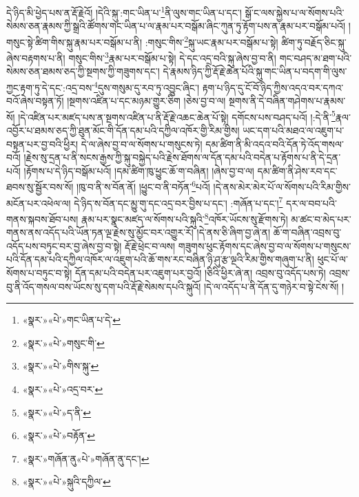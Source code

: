 དེ་ཉིད་མི་ཕྱེད་པས་ན་རྡོ་རྗེའོ། །དེའི་སྐུ་:གང་ཡིན་པ་\footnote{«སྣར་»«པེ་»གང་ཡིན་པ་དེ་}ནི་ལུས་གང་ཡིན་པ་དང་། སྒོ་ང་ལས་སྐྱེས་པ་ལ་སོགས་པའི་སེམས་ཅན་རྣམས་ཀྱི་སྒྲའི་ཚོགས་གང་ཡིན་པ་ལ་རྣམ་པར་བསྒོམ་ཞིང་ཀུན་ཏུ་རྟོག་པས་ན་རྣམ་པར་བསྒོམ་པའོ། །གསུང་སྟེ་ཚིག་གིས་སྐུ་རྣམ་པར་བསྒོམ་པ་ནི། :གསུང་གིས་\footnote{«སྣར་»«པེ་»གསུང་གི་}སྐུ་ཡང་རྣམ་པར་བསྒོམ་པ་སྟེ། ཚིག་ཏུ་བརྗོད་ཅིང་སྐུ་ཞེས་བརྟགས་པ་ནི། གསུང་གིས་\footnote{«སྣར་»«པེ་»གིས་སྐུ་}རྣམ་པར་བསྒོམ་པ་སྟེ། དེ་དང་འདྲ་བའི་སྐུ་ཞེས་བྱ་བ་ནི། གང་བཤད་མ་ཐག་པའི་སེམས་ཅན་ཐམས་ཅད་ཀྱི་སྔགས་ཀྱི་གཟུགས་དང་། དེ་རྣམས་ཉིད་ཀྱི་རྡོ་རྗེ་ཆེན་པོའི་སྐུ་གང་ཡིན་པ་བདག་གི་ལུས་ཀྱང་རྟག་ཏུ་དེ་དང་:འདྲ་བས་\footnote{«སྣར་»«པེ་»འདྲ་བར་}དུས་གསུམ་དུ་རབ་ཏུ་འབྱུང་ཞིང་། རྟག་པ་ཉིད་དུ་ངོ་བོ་ཉིད་ཀྱིས་འདའ་བར་དཀའ་བའོ་ཞེས་བསྟན་ཏོ། །སྔགས་འཛིན་པ་དང་མཉམ་གྱུར་ཅིག །ཅེས་བྱ་བ་ལ། སྔགས་ནི་དེ་བཞིན་གཤེགས་པ་རྣམས་སོ། །དེ་འཛིན་པར་མཛད་པས་ན་སྔགས་འཛིན་པ་ནི་རྡོ་རྗེ་འཆང་ཆེན་པོ་སྟེ། དགོངས་པས་བཤད་པའོ། །:དེ་ནི་\footnote{«སྣར་»«པེ་»ད་ནི་}རྣལ་འབྱོར་པ་ཐམས་ཅད་ཀྱི་ཐུན་མོང་གི་དོན་དམ་པའི་དཀྱིལ་འཁོར་གྱི་རིམ་གྱིས། ཡང་དག་པའི་མཐའ་ལ་འཇུག་པ་བསྟན་པར་བྱ་བའི་ཕྱིར། དེ་ལ་ཞེས་བྱ་བ་ལ་སོགས་པ་གསུངས་ཏེ། དམ་ཚིག་ནི་མི་འདའ་བའི་དོན་ཏེ་འོད་གསལ་བའོ། །རྗེས་སུ་དྲན་པ་ནི་སངས་རྒྱས་ཀྱི་སྐུ་བསྐྱེད་པའི་རྗེས་ཐོགས་ལ་དོན་དམ་པའི་བདེན་པ་རྟོགས་པ་ནི་དེ་དྲན་པའོ། །རྟོགས་པ་དེ་ཉིད་བསྒོམ་པའོ། །དམ་ཚིག་ཁུ་ཕྱུང་ཆོ་ག་བཞིན། །ཞེས་བྱ་བ་ལ། དམ་ཚིག་ནི་ཤེས་རབ་དང་ཐབས་སུ་སྦྱོར་བས་སོ། །ཁུ་བ་ནི་ས་བོན་ནོ། །ཕྱུང་བ་ནི་བཏོན་\footnote{«སྣར་»«པེ་»བརྟོན་}པའོ། །དེ་ནས་མེར་མེར་པོ་ལ་སོགས་པའི་རིམ་གྱིས་མངོན་པར་འཕེལ་ལ། དེ་ཉིད་ས་བོན་དང་མྱུ་གུ་དང་འདྲ་བར་བྱིས་པ་དང་། :གཞོན་པ་དང་།\footnote{«སྣར་»གཞོན་ནུ«པེ་»གཞོན་ནུ་དང་།} དར་ལ་བབ་པའི་གནས་སྐབས་ཐོབ་པས། རྣམ་པར་སྣང་མཛད་ལ་སོགས་པའི་སྐུའི་\footnote{«སྣར་»«པེ་»སྐུའི་དཀྱིལ་}འཁོར་ཡོངས་སུ་རྫོགས་ཏེ། མ་ཚང་བ་མེད་པར་གནས་ནས་འདོད་པའི་ཡོན་ཏན་ལྔ་རྗེས་སུ་མྱོང་བར་འགྱུར་རོ། །དེ་ནས་ཅི་ཞིག་བྱ་ཞེ་ན། ཆོ་ག་བཞིན་འབྲས་བུ་འདོད་པས་བཏུང་བར་བྱ་ཞེས་བྱ་བ་སྟེ། རྡོ་རྗེ་ཕྲེང་བ་ལས། གཟུགས་ཕུང་རྟོགས་དང་ཞེས་བྱ་བ་ལ་སོགས་པ་གསུངས་པའི་དོན་དམ་པའི་དཀྱིལ་འཁོར་ལ་འཇུག་པའི་ཆོ་གས་རང་བཞིན་ཉི་ཤུ་རྩ་ལྔའི་རིམ་གྱིས་གཞུག་པ་ནི། ཕུང་པོ་ལ་སོགས་པ་བཏུང་བ་སྟེ། དོན་དམ་པའི་བདེན་པར་འཇུག་པར་བྱའོ། །ཅིའི་ཕྱིར་ཞེ་ན། འབྲས་བུ་འདོད་པས་ཏེ། འབྲས་བུ་ནི་འོད་གསལ་བས་ཡོངས་སུ་དག་པའི་རྡོ་རྗེ་སེམས་དཔའི་སྐུའོ། །དེ་ལ་འདོད་པ་ནི་དོན་དུ་གཉེར་བ་སྟེ་ངེས་སོ། །
